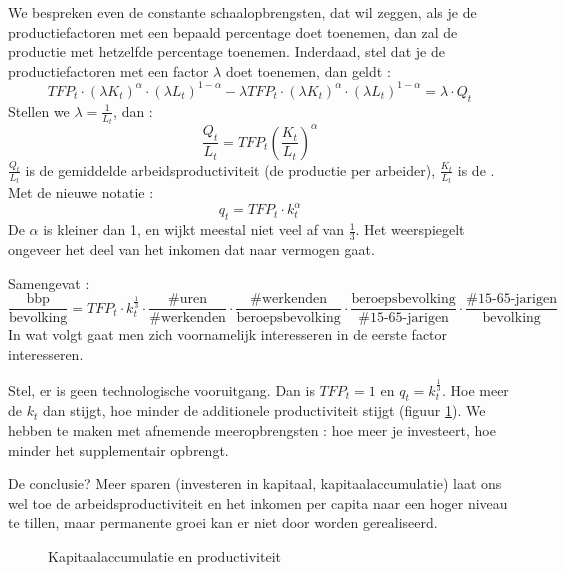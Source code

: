 \par\noindent We bespreken even de constante schaalopbrengsten, dat wil zeggen, als je de productiefactoren met een bepaald percentage doet toenemen, dan zal de productie met hetzelfde percentage toenemen. Inderdaad, stel dat je de productiefactoren met een factor $\lambda$ doet toenemen, dan geldt :
$$TFP_t\cdot (\lambda K_t)^{\alpha}\cdot (\lambda L_t)^{1-\alpha}-\lambda TFP_t\cdot (\lambda K_t)^{\alpha}\cdot (\lambda L_t)^{1-\alpha}=\lambda\cdot Q_t$$
Stellen we $\lambda=\frac{1}{L_t}$, dan :
$$\frac{Q_t}{L_t}=TFP_t\left(\frac{K_t}{L_t}\right)^{\alpha}$$
$\frac{Q_t}{L_t}$ is de gemiddelde arbeidsproductiviteit (de productie per arbeider), $\frac{K_t}{L_t}$ is de .
\\ Met de nieuwe notatie :
$$q_t = TFP_t\cdot k_t^{\alpha}$$
De $\alpha$ is kleiner dan 1, en wijkt meestal niet veel af van $\frac{1}{3}$. Het weerspiegelt ongeveer het deel van het inkomen dat naar vermogen gaat. \\

\par Samengevat :
$$\frac{\text{bbp}}{\text{bevolking}}=TFP_t\cdot k_t^{\frac{1}{3}}\cdot\frac{\text{\#uren}}{\text{\#werkenden}}\cdot\frac{\text{\#werkenden}}{\text{beroepsbevolking}}\cdot\frac{\text{beroepsbevolking}}{\text{\#15-65-jarigen}}\cdot\frac{\text{\#15-65-jarigen}}{\text{bevolking}}$$
In wat volgt gaat men zich voornamelijk interesseren in de eerste factor interesseren.

Stel, er is geen technologische vooruitgang. Dan is $TFP_t=1$ en $q_t=k_t^{\frac{1}{3}}$. Hoe meer de  $k_t$ dan stijgt, hoe minder de additionele productiviteit stijgt (figuur \ref{fig:h6accum}). We hebben te maken met afnemende meeropbrengsten : hoe meer je investeert, hoe minder het supplementair opbrengt. 
\par De conclusie? Meer sparen (investeren in kapitaal, kapitaalaccumulatie) laat ons wel toe de arbeidsproductiviteit en het inkomen per capita naar een hoger niveau te tillen, maar permanente groei kan er niet door worden gerealiseerd.

\begin{figure}[H]
\vspace{0.5cm}
\centering\small
\captionsetup{justification=centering,margin=2cm}
\caption{Kapitaalaccumulatie en productiviteit}
\label{fig:h6accum}
\end{figure}

